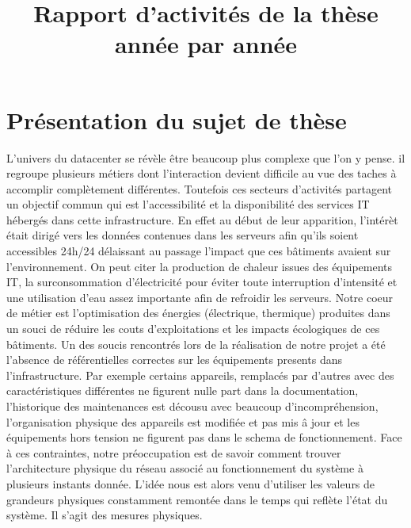 \documentclass[onecolumn, 12pt]{article}
\title{Rapport d'activit\'es de la th\`ese ann\'ee par ann\'ee}
\date{\oldstylenums{2017}}
\begin{document}
\maketitle
\tableofcontents

\section{Pr\'esentation du sujet de th\`ese}
		
L'univers du datacenter se r\'ev\`ele \^etre beaucoup plus complexe que l'on y pense. il regroupe plusieurs m\'etiers dont l'interaction devient difficile au vue des taches \`a accomplir compl\`etement diff\'erentes. Toutefois ces secteurs d'activit\'es partagent un objectif commun qui est l'accessibilit\'e et la disponibilit\'e des services IT h\'eberg\'es dans cette infrastructure. En effet au d\'ebut de leur apparition, l'int\'er\`et \'etait dirig\'e vers les donn\'ees contenues dans les serveurs afin qu'ils soient accessibles 24h/24 d\'elaissant au passage l'impact que ces b\^atiments avaient sur l'environnement. On peut citer la production de chaleur issues des \'equipements IT, la surconsommation d'\'electricit\'e pour \'eviter toute interruption d'intensit\'e et une utilisation d'eau assez importante afin de refroidir les serveurs.\newline
Notre coeur de m\'etier est l'optimisation des \'energies (\'electrique, thermique) produites dans un souci de r\'eduire les couts d'exploitations et les impacts \'ecologiques de ces b\^atiments. Un des soucis rencontr\'es lors de la r\'ealisation de notre projet a \'et\'e l'absence de r\'ef\'erentielles correctes sur les \'equipements presents dans l'infrastructure. Par exemple certains appareils, remplac\'es par d'autres avec des caract\'eristiques diff\'erentes ne figurent nulle part dans la documentation, l'historique des maintenances est d\'ecousu avec beaucoup d'incompr\'ehension, l'organisation physique des appareils est modifi\'ee et pas mis \^a jour et les \'equipements hors tension ne figurent pas dans le schema de fonctionnement.\newline
 Face \`a ces contraintes, notre pr\'eoccupation est de savoir comment trouver l'architecture physique du r\'eseau associ\'e au fonctionnement du syst\`eme \`a plusieurs instants donn\'ee. 
 L'id\'ee nous est alors venu d'utiliser les valeurs de grandeurs physiques constamment remont\'ee dans le temps qui refl\`ete l'\'etat du syst\`eme. Il s'agit des mesures physiques. 
\end{document}

